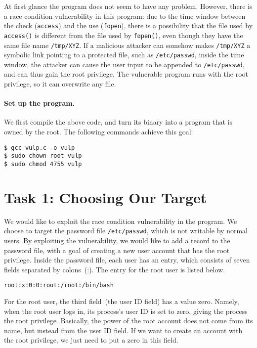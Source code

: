 At first glance the program does not seem to have any problem.
However, there is a race condition vulnerability in this program: due to the 
time window between the check ({\tt access}) and 
the use ({\tt fopen}), there is a possibility that the file used by
{\tt access()} is different from the file used by {\tt fopen()}, even
though they have the same file name {\tt /tmp/XYZ}.  If a malicious 
attacker can somehow makes {\tt /tmp/XYZ} a symbolic link pointing to
a protected file, such as \texttt{/etc/passwd}, inside the time window, 
the attacker can cause the user input
to be appended to \texttt{/etc/passwd}, and can thus gain the root
privilege. The vulnerable program runs with the root privilege, so
it can overwrite any file.


\paragraph{Set up the \setuid program.}
We first compile the above code, and turn its binary into a \setuid program that is owned by the
root. The following commands achieve this goal:

\begin{lstlisting}
$ gcc vulp.c -o vulp
$ sudo chown root vulp
$ sudo chmod 4755 vulp
\end{lstlisting}



\section{Task 1: Choosing Our Target}

We would like to exploit the race condition vulnerability in
the program.
We choose to target the password file \texttt{/etc/passwd}, which is not writable by
normal users. By exploiting the vulnerability, we would like to
add a record to the password file, with a goal of
creating a new user account that has the root privilege.
Inside the password file, each user has an entry, which consists of seven fields
separated by colons~(:). The entry for the root user is listed below.

\begin{lstlisting}
root:x:0:0:root:/root:/bin/bash
\end{lstlisting}

For the root user, the third field~(the user ID field) has a value zero. Namely, when the root
user logs in, its process's user ID is set to zero, giving the process the root privilege.
Basically, the power of the root account does not come from its name, but instead from
the user ID field. If we want to create an account with the root privilege,
we just need to put a zero in this field.


